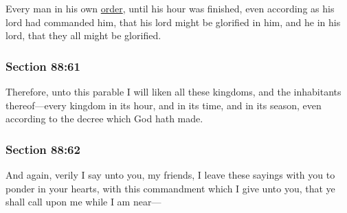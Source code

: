 		Every man in his own \hyperref[ORDER]{order}, until his hour was finished, even according as his lord had commanded him, that his lord might be glorified in him, and he in his lord, that they all might be glorified.


	\subsubsection{Section 88:61} %
		\label{DC88-61}

		Therefore, unto this parable I will liken all these kingdoms, and the inhabitants thereof---every kingdom in its hour, and in its time, and in its season, even according to the decree which God hath made.


	\subsubsection{Section 88:62} %
		\label{DC88-62}

		And again, verily I say unto you, my friends, I leave these sayings with you to ponder in your hearts, with this commandment which I give unto you, that ye shall call upon me while I am near---


